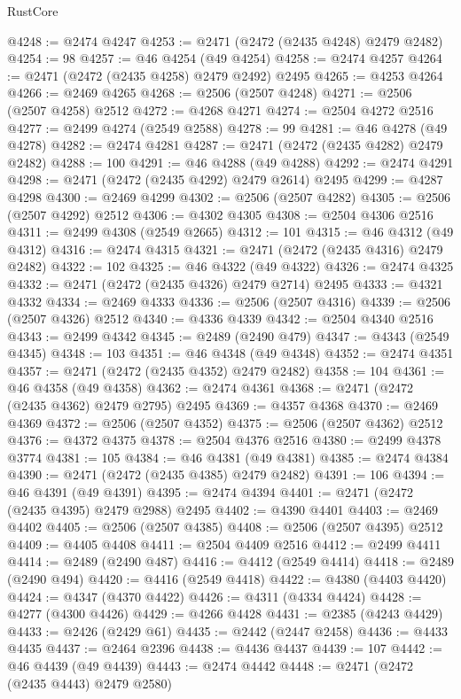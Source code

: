\begin{lexlean}{RustCore}
\begin{coremodule}
@4248 := @2474 @4247
@4253 := @2471 (@2472 (@2435 @4248) @2479 @2482)
@4254 := 98
@4257 := @46 @4254 (@49 @4254)
@4258 := @2474 @4257
@4264 := @2471 (@2472 (@2435 @4258) @2479 @2492) @2495
@4265 := @4253 @4264
@4266 := @2469 @4265
@4268 := @2506 (@2507 @4248)
@4271 := @2506 (@2507 @4258) @2512
@4272 := @4268 @4271
@4274 := @2504 @4272 @2516
@4277 := @2499 @4274 (@2549 @2588)
@4278 := 99
@4281 := @46 @4278 (@49 @4278)
@4282 := @2474 @4281
@4287 := @2471 (@2472 (@2435 @4282) @2479 @2482)
@4288 := 100
@4291 := @46 @4288 (@49 @4288)
@4292 := @2474 @4291
@4298 := @2471 (@2472 (@2435 @4292) @2479 @2614) @2495
@4299 := @4287 @4298
@4300 := @2469 @4299
@4302 := @2506 (@2507 @4282)
@4305 := @2506 (@2507 @4292) @2512
@4306 := @4302 @4305
@4308 := @2504 @4306 @2516
@4311 := @2499 @4308 (@2549 @2665)
@4312 := 101
@4315 := @46 @4312 (@49 @4312)
@4316 := @2474 @4315
@4321 := @2471 (@2472 (@2435 @4316) @2479 @2482)
@4322 := 102
@4325 := @46 @4322 (@49 @4322)
@4326 := @2474 @4325
@4332 := @2471 (@2472 (@2435 @4326) @2479 @2714) @2495
@4333 := @4321 @4332
@4334 := @2469 @4333
@4336 := @2506 (@2507 @4316)
@4339 := @2506 (@2507 @4326) @2512
@4340 := @4336 @4339
@4342 := @2504 @4340 @2516
@4343 := @2499 @4342
@4345 := @2489 (@2490 @479)
@4347 := @4343 (@2549 @4345)
@4348 := 103
@4351 := @46 @4348 (@49 @4348)
@4352 := @2474 @4351
@4357 := @2471 (@2472 (@2435 @4352) @2479 @2482)
@4358 := 104
@4361 := @46 @4358 (@49 @4358)
@4362 := @2474 @4361
@4368 := @2471 (@2472 (@2435 @4362) @2479 @2795) @2495
@4369 := @4357 @4368
@4370 := @2469 @4369
@4372 := @2506 (@2507 @4352)
@4375 := @2506 (@2507 @4362) @2512
@4376 := @4372 @4375
@4378 := @2504 @4376 @2516
@4380 := @2499 @4378 @3774
@4381 := 105
@4384 := @46 @4381 (@49 @4381)
@4385 := @2474 @4384
@4390 := @2471 (@2472 (@2435 @4385) @2479 @2482)
@4391 := 106
@4394 := @46 @4391 (@49 @4391)
@4395 := @2474 @4394
@4401 := @2471 (@2472 (@2435 @4395) @2479 @2988) @2495
@4402 := @4390 @4401
@4403 := @2469 @4402
@4405 := @2506 (@2507 @4385)
@4408 := @2506 (@2507 @4395) @2512
@4409 := @4405 @4408
@4411 := @2504 @4409 @2516
@4412 := @2499 @4411
@4414 := @2489 (@2490 @487)
@4416 := @4412 (@2549 @4414)
@4418 := @2489 (@2490 @494)
@4420 := @4416 (@2549 @4418)
@4422 := @4380 (@4403 @4420)
@4424 := @4347 (@4370 @4422)
@4426 := @4311 (@4334 @4424)
@4428 := @4277 (@4300 @4426)
@4429 := @4266 @4428
@4431 := @2385 (@4243 @4429)
@4433 := @2426 (@2429 @61)
@4435 := @2442 (@2447 @2458)
@4436 := @4433 @4435
@4437 := @2464 @2396
@4438 := @4436 @4437
@4439 := 107
@4442 := @46 @4439 (@49 @4439)
@4443 := @2474 @4442
@4448 := @2471 (@2472 (@2435 @4443) @2479 @2580)

\end{coremodule}
\end{lexlean}
